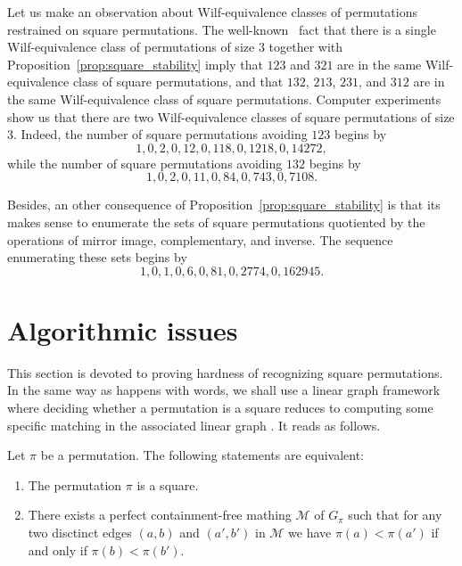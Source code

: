 \documentclass[a4paper]{llncs}
\begin{document}
Let us make an observation about Wilf-equivalence classes of
permutations restrained on square permutations. The
well-known~\cite{Simion:Schmidt:EJC:1985} fact that there is a single
Wilf-equivalence class of permutations of size $3$ together with
Proposition~\ref{prop:square_stability} imply that $123$ and $321$ are
in the same Wilf-equivalence class of square permutations, and that
$132$, $213$, $231$, and $312$ are in the same Wilf-equivalence class of
square permutations. Computer experiments show us that there are two
Wilf-equivalence classes of square permutations of size $3$. Indeed, the
number of square permutations avoiding $123$ begins by
\begin{equation}
    1, 0, 2, 0, 12, 0, 118, 0, 1218, 0, 14272,
\end{equation}
while the number of square permutations avoiding $132$ begins by
\begin{equation}
    1, 0, 2, 0, 11, 0, 84, 0, 743, 0, 7108.
\end{equation}
\medskip

Besides, an other consequence of Proposition~\ref{prop:square_stability}
is that its makes sense to enumerate the sets of square permutations
quotiented by the operations of mirror image, complementary, and
inverse. The sequence enumerating these sets begins by
\begin{equation}
    1, 0, 1, 0, 6, 0, 81, 0, 2774, 0, 162945.
\end{equation}
\medskip


\section{Algorithmic issues}
\label{section:Algorithmic issues}

This section is devoted to proving hardness of recognizing square permutations.
In the same way as happens with words, we shall use a linear graph framework
where deciding whether a permutation is a square reduces to computing some
specific matching in the associated linear graph \cite{Buss:Soltys:2014,Rizzi:Vialette:CSR:2013}.
It reads as follows.

\begin{lemma}
  \label{lemma:matching}
  Let $\pi$ be a permutation. The following statements are equivalent:
  \begin{enumerate}
    \item
    The permutation $\pi$ is a square.
    \item
    There exists a perfect containment-free mathing
    $\mathcal{M}$ of $G_\pi$ such that
    for any two disctinct edges
    $(a, b)$ and $(a', b')$ in $\mathcal{M}$
    we have $\pi(a) < \pi(a')$ if and only if $\pi(b) < \pi(b')$.
  \end{enumerate}
\end{lemma}
\end{document}

